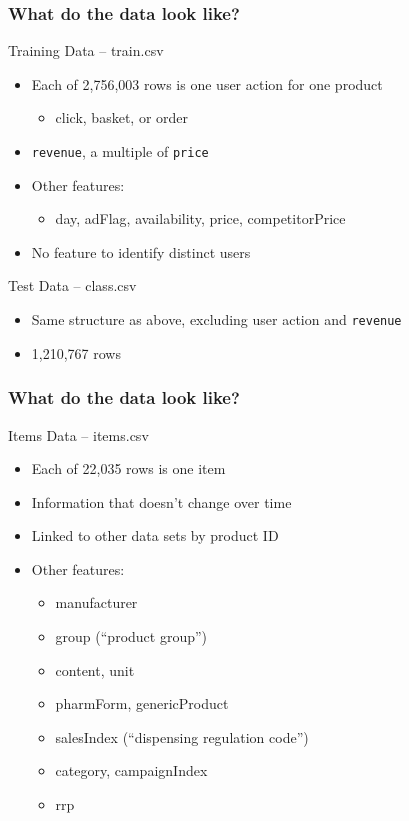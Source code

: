\documentclass{beamer}
\begin{document}
\begin{frame}
  \frametitle{What do the data look like?}
  \begin{block}{Training Data -- train.csv} 
    \begin{itemize}
      \item Each of 2,756,003 rows is one user action for one product
        \begin{itemize}
          \item click, basket, or order
        \end{itemize}
      \item \texttt{revenue}, a multiple of \texttt{price}
      \item Other features:
        \begin{itemize}
          \item day, adFlag, availability, price, competitorPrice
        \end{itemize}
      \item No feature to identify distinct users
    \end{itemize}
  \end{block}

  \begin{block}{Test Data -- class.csv} 
    \begin{itemize}
      \item Same structure as above, excluding user action and \texttt{revenue}
      \item 1,210,767 rows
    \end{itemize}
  \end{block}
\end{frame}

\begin{frame}
  \frametitle{What do the data look like?}
  \begin{block}{Items Data -- items.csv} 
    \begin{itemize}
      \item Each of 22,035 rows is one item
      \item Information that doesn't change over time
      \item Linked to other data sets by product ID
      \item Other features:
        \begin{itemize}
          \item manufacturer
          \item group (``product group'')
          \item content, unit
          \item pharmForm, genericProduct
          \item salesIndex (``dispensing regulation code'')
          \item category, campaignIndex
          \item rrp
        \end{itemize}
    \end{itemize}
  \end{block}
\end{frame}
\end{document}
